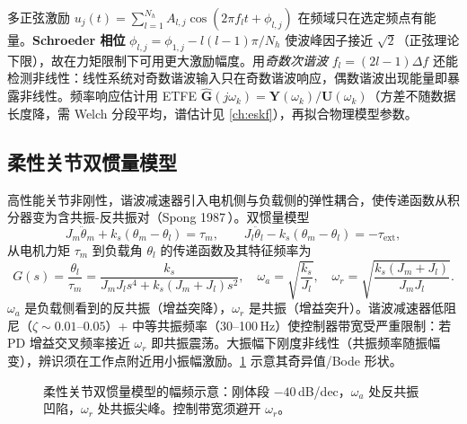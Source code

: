 多正弦激励 $u_j(t)=\sum_{l=1}^{N_h}A_{l,j}\cos(2\pi f_l t+\phi_{l,j})$ 在频域只在选定频点有能量。\textbf{Schroeder 相位} $\phi_{l,j}=\phi_{1,j}-l(l-1)\pi/N_h$ 使波峰因子接近 $\sqrt2$（正弦理论下限），故在力矩限制下可用更大激励幅度。用\emph{奇数次谐波} $f_l=(2l-1)\Delta f$ 还能检测非线性：线性系统对奇数谐波输入只在奇数谐波响应，偶数谐波出现能量即暴露非线性。频率响应估计用 ETFE $\hat{\mathbf G}(j\omega_k)=\mathbf Y(\omega_k)/\mathbf U(\omega_k)$（方差不随数据长度降，需 Welch 分段平均，谱估计见 \cref{ch:eskf}），再拟合物理模型参数。

\subsection{柔性关节双惯量模型}
高性能关节非刚性，谐波减速器引入电机侧与负载侧的弹性耦合，使传递函数从积分器变为含共振-反共振对（Spong 1987\,\cite{spong1987flexible}）。双惯量模型
\begin{equation}
  J_m\ddot\theta_m+k_s(\theta_m-\theta_l)=\tau_m,\qquad J_l\ddot\theta_l-k_s(\theta_m-\theta_l)=-\tau_{\text{ext}},
\end{equation}
从电机力矩 $\tau_m$ 到负载角 $\theta_l$ 的传递函数及其特征频率为
\begin{equation}
  G(s)=\frac{\theta_l}{\tau_m}=\frac{k_s}{J_m J_l s^4+k_s(J_m+J_l)s^2},\quad
  \omega_a=\sqrt{\frac{k_s}{J_l}},\quad
  \omega_r=\sqrt{\frac{k_s(J_m+J_l)}{J_m J_l}}.
  \label{eq:flex-joint}
\end{equation}
$\omega_a$ 是负载侧看到的反共振（增益突降），$\omega_r$ 是共振（增益突升）。谐波减速器低阻尼（$\zeta\sim0.01$--$0.05$）+ 中等共振频率（30--100\,Hz）使控制器带宽受严重限制：若 PD 增益交叉频率接近 $\omega_r$ 即共振震荡。大振幅下刚度非线性（共振频率随振幅变），辨识须在工作点附近用小振幅激励。\cref{fig:flex-bode} 示意其奇异值/Bode 形状。

\begin{figure}[ht]
\centering
{}
\caption{柔性关节双惯量模型的幅频示意：刚体段 $-40\,$dB/dec，$\omega_a$ 处反共振凹陷，$\omega_r$ 处共振尖峰。控制带宽须避开 $\omega_r$。}
\label{fig:flex-bode}
\end{figure}

